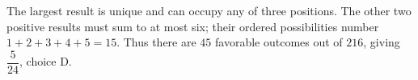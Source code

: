 The largest result is unique and can occupy any of three positions. The other two positive results must sum to at most six; their ordered possibilities number $1+2+3+4+5=15$. Thus there are $45$ favorable outcomes out of $216$, giving $\boxed{\dfrac{5}{24}}$, choice D.
